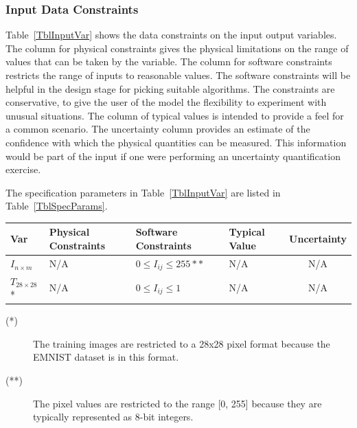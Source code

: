 \documentclass[12pt]{article}
\begin{document}


\subsubsection{Input Data Constraints} \label{sec_DataConstraints}    

Table~\ref{TblInputVar} shows the data constraints on the input output
variables.  The column for physical constraints gives the physical limitations
on the range of values that can be taken by the variable.  The column for
software constraints restricts the range of inputs to reasonable values.  The
software constraints will be helpful in the design stage for picking suitable
algorithms.  The constraints are conservative, to give the user of the model the
flexibility to experiment with unusual situations.  The column of typical values
is intended to provide a feel for a common scenario.  The uncertainty column
provides an estimate of the confidence with which the physical quantities can be
measured.  This information would be part of the input if one were performing an
uncertainty quantification exercise.

The specification parameters in Table~\ref{TblInputVar} are listed in
Table~\ref{TblSpecParams}.

\begin{table}[!h]
  \caption{Input Variables} \label{TblInputVar}
  \renewcommand{\arraystretch}{1.2}
\noindent \begin{longtable*}{l l l l c} 
  \toprule
  \textbf{Var} & \textbf{Physical Constraints} & \textbf{Software Constraints} &
                             \textbf{Typical Value} & \textbf{Uncertainty}\\
  \midrule 
  $I_{n \times m} $ & N/A & $0 \leq I_{ij} \leq 255**$ & N/A & N/A
  \\
  $T_{28 \times 28}$* & N/A & $0 \leq I_{ij} \leq 1$ & N/A & N/A
  \\
  \bottomrule
\end{longtable*}
\end{table}

\noindent 
\begin{description}
\item[(*)] The training images are restricted to a 28x28 pixel format because
the EMNIST dataset is in this format.
\item[(**)] The pixel values are restricted to the range [0, 255] because they
are typically represented as 8-bit integers.
\end{description}
\end{document}

